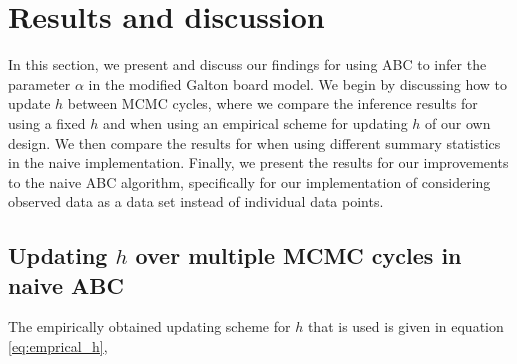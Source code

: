 \documentclass[11pt,a4paper]{article}
\begin{document}











    
    
    
    




\section{Results and discussion}

In this section, we present and discuss our findings for using ABC to infer the parameter $\alpha$ in the modified Galton board model. We begin by discussing how to update $h$ between MCMC cycles, where we compare the inference results for using a fixed $h$ and when using an empirical scheme for updating $h$ of our own design. We then compare the results for when using different summary statistics in the naive implementation. Finally, we present the results for our improvements to the naive ABC algorithm, specifically for our implementation of considering observed data as a data set instead of individual data points. 

\subsection[Task 1]{Updating $h$ over multiple MCMC cycles in naive ABC}
\label{sec:result_h}

The empirically obtained updating scheme for $h$ that is used is given in equation \eqref{eq:emprical_h},
\end{document}
